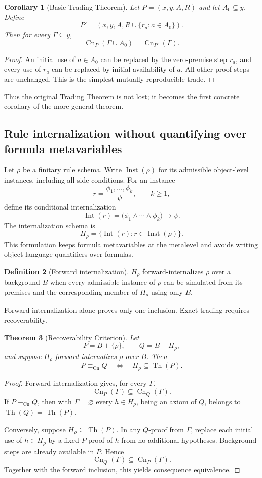 \documentclass[11pt]{article}
\newtheorem{theorem}{Theorem}[section]
\newtheorem{corollary}[theorem]{Corollary}
\theoremstyle{definition}
\newtheorem{definition}[theorem]{Definition}
\theoremstyle{remark}
\newcommand{\Cn}{\operatorname{Cn}}
\newcommand{\Th}{\operatorname{Th}}
\newcommand{\Inst}{\operatorname{Inst}}
\newcommand{\Int}{\operatorname{Int}}
\newcommand{\equivCn}{\equiv_{\mathrm{Cn}}}
\begin{document}
\begin{corollary}[Basic Trading Theorem]\label{cor:basic}
Let $P=(x,y,A,R)$ and let $A_0\subseteq y$. Define
\[
P'=(x,y,A,R\cup\{r_a:a\in A_0\}).
\]
Then for every $\Gamma\subseteq y$,
\[
\Cn_P(\Gamma\cup A_0)=\Cn_{P'}(\Gamma).
\]
\end{corollary}

\begin{proof}
An initial use of $a\in A_0$ can be replaced by the zero-premise step $r_a$, and every use of $r_a$ can be replaced by initial availability of $a$. All other proof steps are unchanged. This is the simplest mutually reproducible trade.
\end{proof}

Thus the original Trading Theorem is not lost; it becomes the first concrete corollary of the more general theorem.

\subsection{Rule internalization without quantifying over formula metavariables}
Let $\rho$ be a finitary rule schema. Write $\Inst(\rho)$ for its admissible object-level instances, including all side conditions. For an instance
\[
r=\frac{\phi_1,\ldots,\phi_k}{\psi},\qquad k\ge 1,
\]
define its conditional internalization
\[
\Int(r)=\bigl(\phi_1\land\cdots\land\phi_k\bigr)\to\psi.
\]
The internalization schema is
\[
H_\rho=\{\Int(r):r\in\Inst(\rho)\}.
\]
This formulation keeps formula metavariables at the metalevel and avoids writing object-language quantifiers over formulas.

\begin{definition}[Forward internalization]
$H_\rho$ forward-internalizes $\rho$ over a background $B$ when every admissible instance of $\rho$ can be simulated from its premises and the corresponding member of $H_\rho$ using only $B$.
\end{definition}

Forward internalization alone proves only one inclusion. Exact trading requires recoverability.

\begin{theorem}[Recoverability Criterion]\label{thm:recoverability}
Let
\[
P=B+\{\rho\},\qquad Q=B+H_\rho,
\]
and suppose $H_\rho$ forward-internalizes $\rho$ over $B$. Then
\[
P\equivCn Q
\quad\Longleftrightarrow\quad
H_\rho\subseteq\Th(P).
\]
\end{theorem}

\begin{proof}
Forward internalization gives, for every $\Gamma$,
\[
\Cn_P(\Gamma)\subseteq\Cn_Q(\Gamma).
\]
If $P\equivCn Q$, then with $\Gamma=\varnothing$ every $h\in H_\rho$, being an axiom of $Q$, belongs to $\Th(Q)=\Th(P)$.

Conversely, suppose $H_\rho\subseteq\Th(P)$. In any $Q$-proof from $\Gamma$, replace each initial use of $h\in H_\rho$ by a fixed $P$-proof of $h$ from no additional hypotheses. Background steps are already available in $P$. Hence
\[
\Cn_Q(\Gamma)\subseteq\Cn_P(\Gamma).
\]
Together with the forward inclusion, this yields consequence equivalence.
\end{proof}
\end{document}
